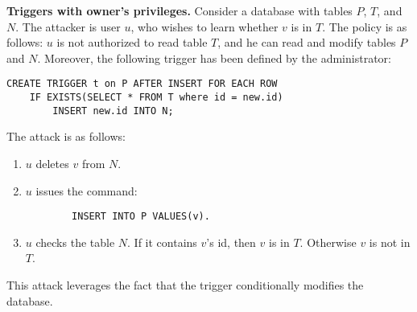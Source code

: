 \begin{attack}
{\bf Triggers with owner's privileges.}
%
Consider a database with tables $P$, $T$, and $N$.
%
The attacker is user $u$, who wishes to learn whether $v$ is in $T$.
%
The policy is as follows:
%
$u$ is not authorized to read table $T$, and he can read and modify tables $P$ and $N$.
%
Moreover, the following trigger has been defined by the administrator:
%
\begin{verbatim}
CREATE TRIGGER t on P AFTER INSERT FOR EACH ROW
	IF EXISTS(SELECT * FROM T where id = new.id)
		INSERT new.id INTO N;
\end{verbatim}
%
The attack is as follows:
%
\begin{enumerate}
	\item $u$ deletes $v$ from $N$.
	\item $u$ issues the command:
		\begin{verbatim}
		INSERT INTO P VALUES(v).
		\end{verbatim}
	\item $u$ checks the table $N$. If it contains $v$'s id, then $v$ is in $T$. Otherwise $v$ is not in $T$.
\end{enumerate}
%
\end{attack}
%
This attack leverages the fact that the trigger conditionally modifies the database.


